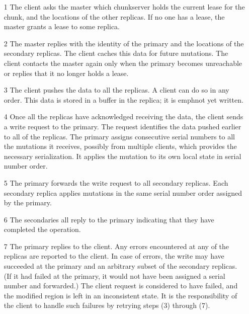 \documentclass{article}
\begin{document}
\begin{itemize}
\item[1] The client asks the master which chunkserver holds the current lease
    for the chunk, and the locations of the other replicas. If no one has a
        lease, the master grants a lease to some replica.


\item[2] The master replies with the identity of the primary and the
    locations of the secondary replicas. The client caches this data
    for future mutations. The client contacts the master again only when
    the primary becomes unreachable or replies that it no longer holds a
    lease. 

\item[3] The client pushes the data to all the replicas. A client can do so in
    any order. This data is stored in a buffer in the replica; it is 
        emph{not yet written}.

\item[4] Once all the replicas have acknowledged receiving the data, the client
    sends a write request to the primary. The request identifies the data
        pushed earlier to all of the replicas. The primary assigns consecutive
        serial numbers to all the mutations it receives, possibly from multiple
        clients, which provides the necessary serialization. It applies the
        mutation to its own local state in serial number order.

\item[5] The primary forwards the write request to all secondary replicas. Each
    secondary replica applies mutations in the same serial number order
    assigned by the primary.

\item[6] The secondaries all reply to the primary indicating that they have
    completed the operation.

\item[7] The primary replies to the client. Any errors encountered at any of
    the replicas are reported to the client.  In case of errors, the write may
        have succeeded at the primary and an arbitrary subset of the secondary
        replicas. (If it had failed at the primary, it would not have been
        assigned a serial number and forwarded.) The client request is
        considered to have failed, and the modified region is left in an
        inconsistent state. It is the responsibility of the client
        to handle such failures by retrying steps (3) through (7).
\end{itemize}
\end{document}
